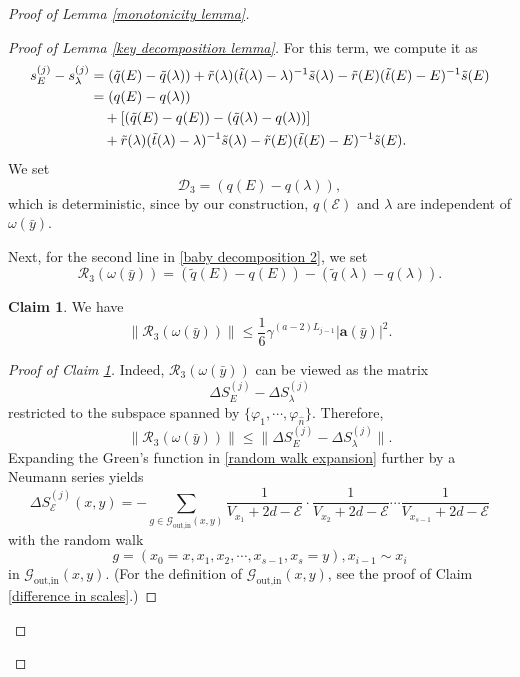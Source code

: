 \documentclass[11pt,reqno,UTF8,twoside]{amsart}
\newcommand{\tq}{\tilde{q}}
\newcommand{\ts}{\tilde{s}}
\newcommand{\tr}{\tilde{r}}
\renewcommand{\tt}{\tilde{t}}
\newcommand{\bfa}{\mathbf{a}}
\newcommand{\mcD}{\mathcal{D}}
\newcommand{\mcE}{\mathcal{E}}
\newcommand{\mcR}{\mathcal{R}}
\newcommand{\mcG}{\mathcal{G}}
\newcommand{\whn}{\widehat{n}}
\newcommand{\smallSj}{s^{(j)}}
\newcommand{\diffSj}{\Delta {S}^{(j)}}
\theoremstyle{definition}
\newtheorem{claim}[thm]{\bf Claim}
\numberwithin{equation}{section}
\begin{document}
\begin{proof}[Proof of Lemma \ref{monotonicity lemma}]
\begin{proof}[Proof of Lemma \ref{key decomposition lemma}]
\noindent For this term, we compute it as 
\begin{align}\label{baby decomposition 2}
 \notag \smallSj_E-\smallSj_{\lambda} &=(\tq(E)-\tq(\lambda)) +\tr(\lambda) (\tt(\lambda)-\lambda)^{-1} \ts(\lambda)  -\tr(E) (\tt(E)-E)^{-1} \ts(E) \\
                     & =(q(E)-q(\lambda)) \\
         \notag                      & \ \ \ +[(\tq(E)-q(E))-(\tq(\lambda) -q(\lambda)) ]\\
         \notag                     &\ \ \ +\tr(\lambda) (\tt(\lambda)-\lambda)^{-1} \ts(\lambda)  -\tr(E) (\tt(E)-E)^{-1} \ts(E).  
\end{align}
We set 
\begin{equation}\label{mcD3}
  \mcD_3= (q(E)-q(\lambda)),
\end{equation}
which is deterministic, since by our construction,  $q(\mcE)$ and $\lambda$ are independent of $\omega(\bar{y})$. 

Next, for the second line in \eqref{baby decomposition 2}, we set 
\begin{equation}\label{mcR3}
  \mcR_3(\omega(\bar{y}))= (\tq(E)-q(E))-(\tq(\lambda) -q(\lambda)).
\end{equation}
\begin{claim}\label{estimate on mcR3}
  We have 
  \[\|\mcR_3(\omega(\bar{y})) \| \leq \frac{1}{6}\gamma^{(a-2)L_{j-1}} |\bfa(\bar{y})|^2 .\]
\end{claim}
\begin{proof}[Proof of Claim \ref{estimate on mcR3}]
Indeed, $\mcR_3(\omega(\bar{y}))$ can be viewed  as the matrix 
\[\diffSj_{E}-\diffSj_{\lambda} \]
restricted to the subspace spanned by $\{\varphi_1,\cdots,\varphi_{\whn}\}$. Therefore,
\[\|\mcR_3(\omega(\bar{y})) \|\leq \| \diffSj_{E}-\diffSj_{\lambda}  \| .\]
Expanding the Green's function in \eqref{random walk expansion} further by a Neumann series yields 
\begin{equation}\label{scales not derivation}
  \diffSj_{\mcE}(x,y) =-\sum_{g\in \mcG_{\text{out,in}}(x,y) } \frac{1}{V_{x_1}+2d-\mcE} \cdot \frac{1}{V_{x_2}+2d-\mcE} \cdots \frac{1}{V_{x_{s-1}}+2d-\mcE} 
\end{equation}
with the random walk 
\[g=(x_0=x,x_1,x_2,\cdots,x_{s-1},x_s=y),x_{i-1}\sim x_i\]
in $\mcG_{\text{out,in}}(x,y)$. (For the definition of $\mcG_{\text{out,in}}(x,y)$, see the proof of Claim \ref{difference in scales}.) 


\end{proof}
\end{proof}
\end{proof}
\end{document}
